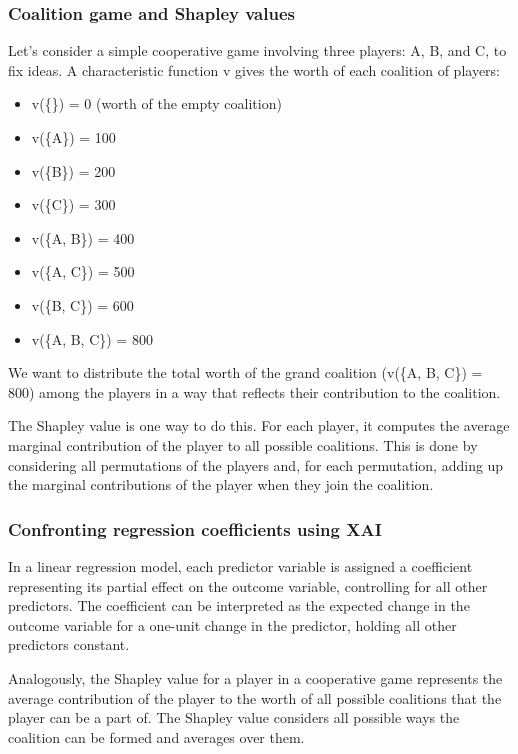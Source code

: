 \documentclass[
  letterpaper,
  DIV=11,
  numbers=noendperiod]{scrartcl}
\providecommand{\tightlist}{%
  \setlength{\itemsep}{0pt}\setlength{\parskip}{0pt}}\usepackage{longtable,booktabs,array}
\begin{document}
\hypertarget{coalition-game-and-shapley-values}{%
\subsubsection{Coalition game and Shapley
values}\label{coalition-game-and-shapley-values}}

Let's consider a simple cooperative game involving three players: A, B,
and C, to fix ideas. A characteristic function v gives the worth of each
coalition of players:

\begin{itemize}
\tightlist
\item
  v(\{\}) = 0 (worth of the empty coalition)
\item
  v(\{A\}) = 100
\item
  v(\{B\}) = 200
\item
  v(\{C\}) = 300
\item
  v(\{A, B\}) = 400
\item
  v(\{A, C\}) = 500
\item
  v(\{B, C\}) = 600
\item
  v(\{A, B, C\}) = 800
\end{itemize}

We want to distribute the total worth of the grand coalition (v(\{A, B,
C\}) = 800) among the players in a way that reflects their contribution
to the coalition.

The Shapley value is one way to do this. For each player, it computes
the average marginal contribution of the player to all possible
coalitions. This is done by considering all permutations of the players
and, for each permutation, adding up the marginal contributions of the
player when they join the coalition.

\hypertarget{confronting-regression-coefficients-using-xai}{%
\subsubsection{Confronting regression coefficients using
XAI}\label{confronting-regression-coefficients-using-xai}}

In a linear regression model, each predictor variable is assigned a
coefficient representing its partial effect on the outcome variable,
controlling for all other predictors. The coefficient can be interpreted
as the expected change in the outcome variable for a one-unit change in
the predictor, holding all other predictors constant.

Analogously, the Shapley value for a player in a cooperative game
represents the average contribution of the player to the worth of all
possible coalitions that the player can be a part of. The Shapley value
considers all possible ways the coalition can be formed and averages
over them.
\end{document}
